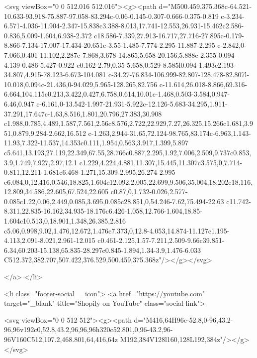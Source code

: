 {{{{{{{<svg viewBox="0 0 512.016 512.016"><g><path d="M500.459,375.368c-64.521-10.633-93.918-75.887-97.058-83.294c-0.06-0.145-0.307-0.666-0.375-0.819 c-3.234-6.571-4.036-11.904-2.347-15.838c3.388-8.013,17.741-12.553,26.931-15.462c2.586-0.836,5.009-1.604,6.938-2.372 c18.586-7.339,27.913-16.717,27.716-27.895c-0.179-8.866-7.134-17.007-17.434-20.651c-3.55-1.485-7.774-2.295-11.887-2.295 c-2.842,0-7.066,0.401-11.102,2.287c-7.868,3.678-14.865,5.658-20.156,5.888c-2.355-0.094-4.139-0.486-5.427-0.922 c0.162-2.79,0.35-5.658,0.529-8.585l0.094-1.493c2.193-34.807,4.915-78.123-6.673-104.081 c-34.27-76.834-106.999-82.807-128.478-82.807l-10.018,0.094c-21.436,0-94.029,5.965-128.265,82.756 c-11.614,26.018-8.866,69.316-6.664,104.115c0.213,3.422,0.427,6.758,0.614,10.01c-1.468,0.503-3.584,0.947-6.46,0.947 c-6.161,0-13.542-1.997-21.931-5.922c-12.126-5.683-34.295,1.911-37.291,17.647c-1.63,8.516,1.801,20.796,27.383,30.908 c1.988,0.785,4.489,1.587,7.561,2.56c8.576,2.722,22.929,7.27,26.325,15.266c1.681,3.951,0.879,9.284-2.662,16.512 c-1.263,2.944-31.65,72.124-98.765,83.174c-6.963,1.143-11.93,7.322-11.537,14.353c0.111,1.954,0.563,3.917,1.399,5.897 c5.641,13.193,27.119,22.349,67.55,28.766c0.887,2.295,1.92,7.006,2.509,9.737c0.853,3.9,1.749,7.927,2.97,12.1 c1.229,4.224,4.881,11.307,15.445,11.307c3.575,0,7.714-0.811,12.211-1.681c6.468-1.271,15.309-2.995,26.274-2.995 c6.084,0,12.416,0.546,18.825,1.604c12.092,2.005,22.699,9.506,35.004,18.202c18.116,12.809,34.586,22.605,67.524,22.605 c0.87,0,1.732-0.026,2.577-0.085c1.22,0.06,2.449,0.085,3.695,0.085c28.851,0,54.246-7.62,75.494-22.63 c11.742-8.311,22.835-16.162,34.935-18.176c6.426-1.058,12.766-1.604,18.85-1.604c10.513,0,18.901,1.348,26.385,2.816 c5.06,0.998,9.02,1.476,12.672,1.476c7.373,0,12.8-4.053,14.874-11.127c1.195-4.113,2.091-8.021,2.961-12.015 c0.461-2.125,1.57-7.211,2.509-9.66c39.851-6.34,60.203-15.138,65.835-28.297c0.845-1.894,1.34-3.9,1.476-6.033 C512.372,382.707,507.422,376.529,500.459,375.368z"/></g></svg>


        </a>
      </li>
    
    
    

    
    
    
<li class="footer-social__icon">
        <a href="https://youtube.com" target="_blank" title="Shopily on YouTube" class="social-link">
          
<svg viewBox="0 0 512 512"><g><path d="M416,64H96c-52.8,0-96,43.2-96,96v192c0,52.8,43.2,96,96,96h320c52.801,0,96-43.2,96-96V160C512,107.2,468.801,64,416,64z M192,384V128l160,128L192,384z"/></g></svg>


}}}}}}}
